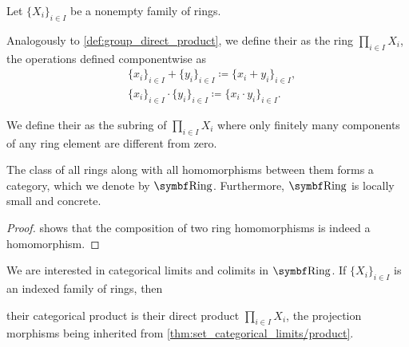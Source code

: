 \begin{definition}\label{def:ring_direct_product}
  Let \( \{ X_i \}_{i \in I} \) be a nonempty family of rings.

  Analogously to \cref{def:group_direct_product}, we define their  as the ring \( \prod_{i \in I} X_i \), the operations defined componentwise as
  \begin{align*}
    &\{ x_i \}_{i \in I} + \{ y_i \}_{i \in I}
    \coloneqq
    \{ x_i + y_i \}_{i \in I}, \\
    &\{ x_i \}_{i \in I} \cdot \{ y_i \}_{i \in I}
    \coloneqq
    \{ x_i \cdot y_i \}_{i \in I}.
  \end{align*}

  We define their  as the subring of \( \prod_{i \in I} X_i \) where only finitely many components of any ring element are different from zero.
\end{definition}

\begin{definition}\label{def:category_of_rings}
  The class of all rings along with all homomorphisms between them forms a category, which we denote by \( \Bold{Ring} \). Furthermore, \( \Bold{Ring} \) is locally small and concrete.
\end{definition}
\begin{proof}
   shows that the composition of two ring homomorphisms is indeed a homomorphism.
\end{proof}

\begin{proposition}\label{thm:ring_categorical_limits}
  We are interested in categorical limits and colimits in \( \Bold{Ring} \). If \( \{ X_i \}_{i \in I} \) is an indexed family of rings, then
  \begin{defenum}
     their categorical product is their direct product \( \prod_{i \in I} X_i \), the projection morphisms being inherited from \cref{thm:set_categorical_limits/product}.
  \end{defenum}
\end{proposition}

